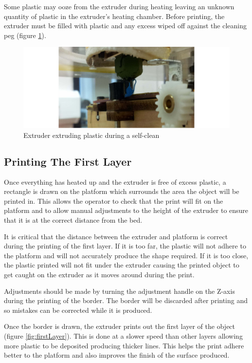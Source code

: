 			Some plastic may ooze from the extruder during heating leaving an unknown
			quantity of plastic in the extruder's heating chamber. Before printing,
			the extruder must be filled with plastic and any excess wiped off against
			the cleaning peg (figure \ref{fig:selfClean}).
			
			\begin{figure}
				\includegraphics[width=1\textwidth]{diagrams/selfClean.pdf}
				\caption{Extruder extruding plastic during a self-clean}
				\label{fig:selfClean}
			\end{figure}
		
		\subsection{Printing The First Layer}
			
			Once everything has heated up and the extruder is free of excess plastic,
			a rectangle is drawn on the platform which surrounds the area the object
			will be printed in. This allows the operator to check that the print will
			fit on the platform and to allow manual adjustments to the height of the
			extruder to ensure that it is at the correct distance from the bed.
			
			It is critical that the distance between the extruder and platform is
			correct during the printing of the first layer. If it is too far, the
			plastic will not adhere to the platform and will not accurately produce
			the shape required. If it is too close, the plastic printed will not fit
			under the extruder causing the printed object to get caught on the
			extruder as it moves around during the print.
			
			Adjustments should be made by turning the adjustment handle on the Z-axis
			during the printing of the border. The border will be discarded after
			printing and so mistakes can be corrected while it is produced.
			
			Once the border is drawn, the extruder prints out the first layer of the
			object (figure \ref{fig:firstLayer}). This is done at a slower speed than
			other layers allowing more plastic to be deposited producing thicker
			lines. This helps the print adhere better to the platform and also
			improves the finish of the surface produced.
			
